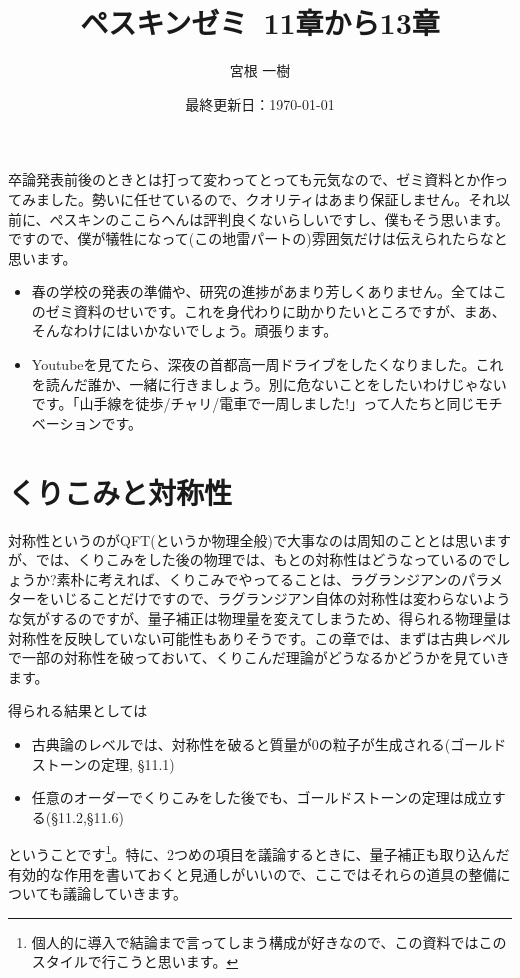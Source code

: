 \documentclass[unicode,a4paper,11pt]{ltjsarticle}
\title{ペスキンゼミ\ 11章から13章}
\author{宮根 一樹}
\date{最終更新日：\today}
\theoremstyle{definition}
\begin{document}
\maketitle

\tableofcontents

\vspace*{10pt}

卒論発表前後のときとは打って変わってとっても元気なので、ゼミ資料とか作ってみました。勢いに任せているので、クオリティはあまり保証しません。それ以前に、ぺスキンのここらへんは評判良くないらしいですし、僕もそう思います。ですので、僕が犠牲になって(この地雷パートの)雰囲気だけは伝えられたらなと思います。

\vspace*{10pt}

\begin{itemize}
   \item
         春の学校の発表の準備や、研究の進捗があまり芳しくありません。全てはこのゼミ資料のせいです。これを身代わりに助かりたいところですが、まあ、そんなわけにはいかないでしょう。頑張ります。
   \item
         Youtubeを見てたら、深夜の首都高一周ドライブをしたくなりました。これを読んだ誰か、一緒に行きましょう。別に危ないことをしたいわけじゃないです。「山手線を徒歩/チャリ/電車で一周しました!」って人たちと同じモチベーションです。
\end{itemize}

\clearpage

\section{くりこみと対称性}

対称性というのがQFT(というか物理全般)で大事なのは周知のこととは思いますが、では、くりこみをした後の物理では、もとの対称性はどうなっているのでしょうか?素朴に考えれば、くりこみでやってることは、ラグランジアンのパラメターをいじることだけですので、ラグランジアン自体の対称性は変わらないような気がするのですが、量子補正は物理量を変えてしまうため、得られる物理量は対称性を反映していない可能性もありそうです。この章では、まずは古典レベルで一部の対称性を破っておいて、くりこんだ理論がどうなるかどうかを見ていきます。

得られる結果としては
\begin{itemize}
   \item
         古典論のレベルでは、対称性を破ると質量が0の粒子が生成される(ゴールドストーンの定理, \S11.1)
   \item
         任意のオーダーでくりこみをした後でも、ゴールドストーンの定理は成立する(\S11.2,\S11.6)
\end{itemize}
ということです\footnote{
   個人的に導入で結論まで言ってしまう構成が好きなので、この資料ではこのスタイルで行こうと思います。
}。特に、2つめの項目を議論するときに、量子補正も取り込んだ有効的な作用を書いておくと見通しがいいので、ここではそれらの道具の整備についても議論していきます。
\end{document}
